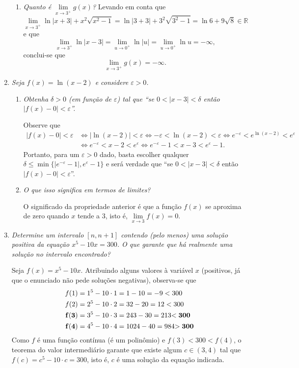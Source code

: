 \documentclass[12pt,a4paper]{article}
\newcommand*\abs[1]{\left|#1\right|}
\begin{document}
\begin{enumerate}
\begin{enumerate}
\item \textit{ Quanto é $\lim\limits_{x\to3^+} g(x)$?}
Levando em conta que
\[
\lim\limits_{x\to3^+} \ln{|x + 3|} + x^2\sqrt{x^2-1}
= \ln{|3 + 3|} + 3^2\sqrt{3^2-1}
= \ln{6} + 9\sqrt{8} \in \mathbb{R}
\]
e que
\[
\lim\limits_{x\to3^+} \ln{\abs{x - 3}}
= \lim\limits_{u\to 0^+} \ln{\abs{u}}
= \lim\limits_{u\to 0^+} \ln{u}
= -\infty,
\]
conclui-se que
\[
\lim\limits_{x\to 3^+} g(x) = - \infty.
\]

\end{enumerate}

\item \textit{ Seja $f(x) = \ln(x - 2)$ e considere $\varepsilon > 0$.}
\begin{enumerate}
\item \textit{ Obtenha $\delta > 0$ (em função de $\varepsilon$) tal que ``se $0 < |x - 3| < \delta$ então $|f(x) - 0| < \varepsilon$''.}

Observe que
\begin{align*}
\abs{f(x) - 0} < \varepsilon
& \Leftrightarrow \abs{ \ln(x - 2) } < \varepsilon
  \Leftrightarrow -\varepsilon < \ln(x - 2) < \varepsilon
  \Leftrightarrow e^{-\varepsilon} < e^{\ln(x - 2)} < e^\varepsilon \\
& \Leftrightarrow e^{-\varepsilon} < x - 2 < e^\varepsilon
  \Leftrightarrow e^{-\varepsilon} -1 < x - 3 < e^\varepsilon -1.
\end{align*}
Portanto, para um $\varepsilon>0$ dado, basta escolher qualquer $\delta \leq \min\{ \abs{e^{-\varepsilon} -1 }, e^\varepsilon -1\}$ e será verdade que ``se $0 < \abs{x - 3} < \delta$ então $\abs{f(x) - 0} < \varepsilon$''.



\item \textit{ O que isso significa em termos de limites?}

O significado da propriedade anterior é que a função $f(x)$ se aproxima de zero quando $x$ tende a $3$, isto é, $\lim\limits_{x\to3} f(x) = 0$.

\end{enumerate}

\item \textit{ Determine um intervalo $[n, n+1]$ contendo (pelo menos) uma solução positiva da equação $x^5 - 10x = 300$. O que garante que há realmente uma solução no intervalo encontrado?}

Seja $f(x) = x^5 - 10x$. Atribuindo alguns valores à variável $x$ (positivos, já que o enunciado não pede soluções negativas), observa-se que
\begin{align*}
f(1) & = 1^5 - 10 \cdot 1 = 1 - 10 = -9 < 300 \\
f(2) & = 2^5 - 10 \cdot 2 = 32 - 20 = 12 < 300 \\
\bf{ f(3) } & = 3^5 - 10 \cdot 3 = 243 - 30 = 213 \bf{ < 300 }\\
\bf{ f(4) } & = 4^5 - 10 \cdot 4 = 1024 - 40 = 984 \bf{ > 300 }
\end{align*}
Como $f$ é uma função contínua (é um polinômio) e $f(3) < 300 < f(4)$, o teorema do valor intermediário garante que existe algum $c \in (3,4)$ tal que $f(c) = c^5 - 10 \cdot c = 300$, isto é, $c$ é uma solução da equação indicada.


\end{enumerate}
\end{document}
